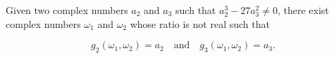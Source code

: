 Given two complex numbers $a_2$ and $a_3$ such that $a_2^3 - 27a_3^2 \neq 0$, there exist complex numbers $\omega_1$ and $\omega_2$ whose ratio is not real such that

$$g_2(\omega_1, \omega_2) = a_2 \quad \text{and} \quad g_3(\omega_1, \omega_2) = a_3.$$
